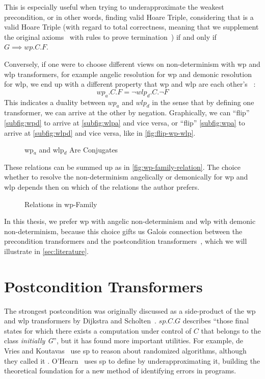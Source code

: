 This is especially useful when trying to underapproximate the weakest precondition, %
or in other words, finding valid Hoare Triple, considering that  is a valid Hoare Triple (with regard to total correctness, meaning that we supplement the original axioms~\cite{hoare69} with rules to prove termination~\cite{manna74}) if and only if $G\implies wp.C.F$.

Conversely, if one were to choose different views on non-determinism with wp and wlp transformers, for example angelic resolution for wp and demonic resolution for wlp, we end up with a different property that wp and wlp are each other's ~\cite{dijkstra76,zhang22}: 
$$ wp_a.C.F = \neg wlp_d.C.\neg F $$ 
This indicates a duality between $wp_a$ and $wlp_d$ in the sense that by defining one transformer, we can arrive at the other by negation. 
Graphically, we can ``flip'' \autoref{subfig:wpd} to arrive at \autoref{subfig:wlpa} and vice versa, or ``flip'' \autoref{subfig:wpa} to arrive at \autoref{subfig:wlpd} and vice versa, like in \autoref{fig:flip-wp-wlp}. 
\begin{figure}[ht]
	\centering
	
	\caption{wp$_a$ and wlp$_d$ Are Conjugates}
	\label{fig:flip-wp-wlp}
\end{figure}

These relations can be summed up as in \autoref{fig:wp-family-relation}. 
The choice whether to resolve the non-determinism angelically or demonically for wp and wlp depends then on which of the relations the author prefers. 
\begin{figure}[ht]
	\centering
	
	\caption{Relations in wp-Family}
	\label{fig:wp-family-relation}
\end{figure}

In this thesis, we prefer wp with angelic non-determinism and wlp with demonic non-determinism, because this choice gifts us Galois connection between the precondition transformers and the postcondition transformers~\cite{zhang22}, which we will illustrate in \autoref{sec:literature}. 


\section{Postcondition Transformers}
The strongest postcondition was originally discussed as a side-product of the wp and wlp transformers by Dijkstra and Scholten~\cite{dijkstra90}. 
$sp.C.G$ describes ``those final states for which there exists a computation under control of $C$ that belongs to the class \textit{initially G}'', but it has found more important utilities. 
For example, de Vries and Koutavas~\cite{vries11} use sp to reason about randomized algorithms, although they called it . 
O'Hearn~\cite{ohearn2020IncorrectnessLogic} uses sp to define  by underapproximating it, building the theoretical foundation for a new method of identifying errors in programs. 

